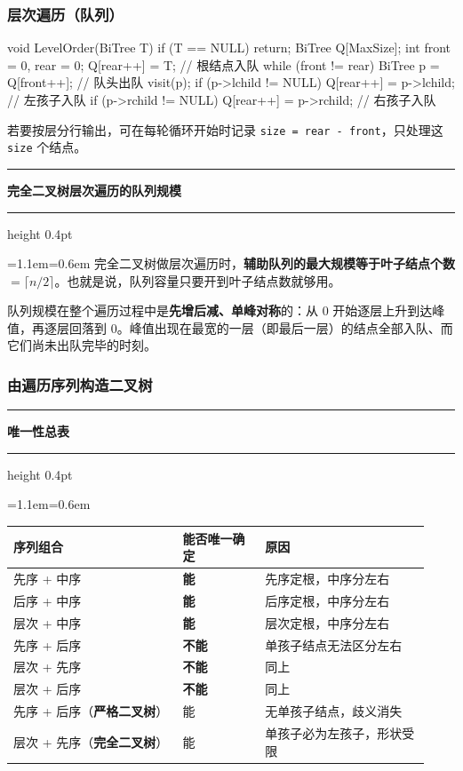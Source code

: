 \documentclass[11pt,openany,UTF8]{ctexbook}
\newcommand{\callouthead}[2]{%
  \par\addvspace{7pt}\noindent
  {\color{#1}\rule[-0.15em]{3pt}{1.05em}}\hspace{0.5em}%
  {\bfseries\color{#1}#2}\par\nobreak\vspace{-0.35em}%
  {\color{rulesep}\hrule height 0.4pt}\nobreak\vspace{0.45em}%
  \begingroup\small\setlength{\parindent}{0pt}%
  \leftskip=1.1em\rightskip=0.6em\noindent\ignorespaces}
\newcommand{\calloutend}{\par\endgroup\addvspace{7pt}}
\newenvironment{callkey}[1]{\callouthead{keybar}{#1}}{\calloutend}
\begin{document}
\subsubsection{层次遍历（队列）}

\begin{codebox}
void LevelOrder(BiTree T) {
    if (T == NULL) return;
    BiTree Q[MaxSize];
    int front = 0, rear = 0;
    Q[rear++] = T;                 // 根结点入队
    while (front != rear) {
        BiTree p = Q[front++];     // 队头出队
        visit(p);
        if (p->lchild != NULL) Q[rear++] = p->lchild; // 左孩子入队
        if (p->rchild != NULL) Q[rear++] = p->rchild; // 右孩子入队
    }
}
\end{codebox}

若要按层分行输出，可在每轮循环开始时记录 \texttt{size =\allowbreak{} rear - front}，只处理这 \texttt{size} 个结点。

\begin{callkey}{完全二叉树层次遍历的队列规模}
完全二叉树做层次遍历时，\textbf{辅助队列的最大规模等于叶子结点个数} $=\lceil n/2\rceil$。也就是说，队列容量只要开到叶子结点数就够用。

队列规模在整个遍历过程中是\textbf{先增后减、单峰对称}的：从 0 开始逐层上升到达峰值，再逐层回落到 0。峰值出现在最宽的一层（即最后一层）的结点全部入队、而它们尚未出队完毕的时刻。

\end{callkey}

\subsubsection{由遍历序列构造二叉树}

\begin{callkey}{唯一性总表}
\begingroup\small\setlength{\tabcolsep}{4.0pt}
\begin{longtable}{@{}L{0.3796\linewidth}L{0.1847\linewidth}L{0.3642\linewidth}@{}}
\toprule
\textbf{序列组合} & \textbf{能否唯一确定} & \textbf{原因} \\
\midrule
\endhead
先序 + 中序 & \textbf{能} & 先序定根，中序分左右 \\
后序 + 中序 & \textbf{能} & 后序定根，中序分左右 \\
层次 + 中序 & \textbf{能} & 层次定根，中序分左右 \\
先序 + 后序 & \textbf{不能} & 单孩子结点无法区分左右 \\
层次 + 先序 & \textbf{不能} & 同上 \\
层次 + 后序 & \textbf{不能} & 同上 \\
先序 + 后序（\textbf{严格二叉树}） & 能 & 无单孩子结点，歧义消失 \\
层次 + 先序（\textbf{完全二叉树}） & 能 & 单孩子必为左孩子，形状受限 \\
\bottomrule
\end{longtable}
\endgroup

\end{callkey}
\end{document}

